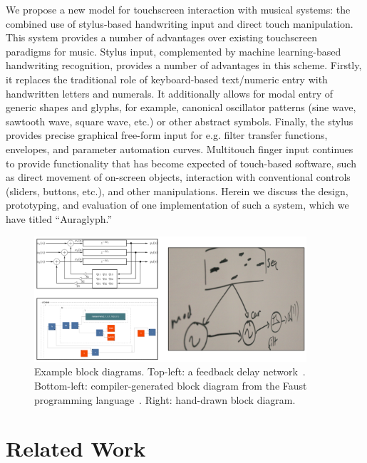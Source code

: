 \documentclass{nime-alternate}
\begin{document}
We propose a new model for touchscreen interaction with musical systems: the combined use of stylus-based handwriting input and direct touch manipulation. 
This system provides a number of advantages over existing touchscreen paradigms for music. 
Stylus input, complemented by machine learning-based handwriting recognition, provides a number of advantages in this scheme. 
Firstly, it replaces the traditional role of keyboard-based text/numeric entry with handwritten letters and numerals.
It additionally allows for modal entry of generic shapes and glyphs, for example, canonical oscillator patterns (sine wave, sawtooth wave, square wave, etc.) or other abstract symbols.
Finally, the stylus provides precise graphical free-form input for e.g. filter transfer functions, envelopes, and parameter automation curves. 
Multitouch finger input continues to provide functionality that has become expected of touch-based software, such as direct movement of on-screen objects, interaction with conventional controls (sliders, buttons, etc.), and other manipulations. 
Herein we discuss the design, prototyping, and evaluation of one implementation of such a system, which we have titled ``Auraglyph.''

\begin{figure}[h!]
	\centering
		\includegraphics[width=0.9\textwidth]{figures/block.png}
	\caption{Example block diagrams. Top-left: a feedback delay network\protect~\cite{smith2010pasp}. Bottom-left: compiler-generated block diagram from the Faust programming language\protect~\cite{faustOnline}. Right: hand-drawn block diagram.}
	\label{fig:blockDiagram}
\end{figure}

\section{Related Work}
\label{sec:RelatedWork}

\end{document}
